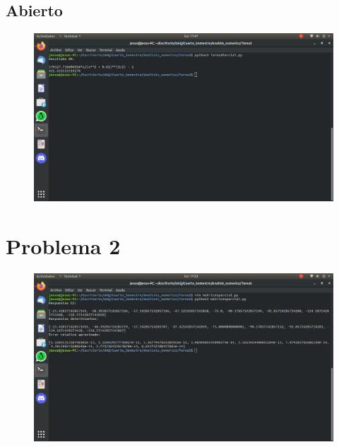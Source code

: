 \documentclass[12pt,oneside,FLEQN]{report}
\begin{document}
{	\subsection{Abierto}
	
	\begin{figure}[!h]
		\centering
		\includegraphics[scale=0.3]{11.png}
	\end{figure}
\section{Problema 2}
	\begin{figure}[!h]
		\centering
		\includegraphics[scale=0.3]{2.png}
	\end{figure}
	
}
\end{document}
